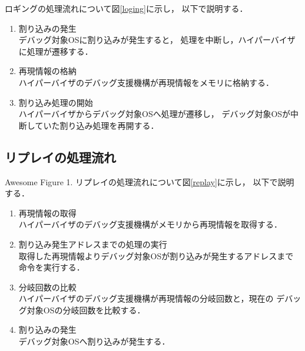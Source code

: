 \documentclass[tanilab-enum]{graduate}
\begin{document}
ロギングの処理流れについて図\ref{loging}に示し，
以下で説明する．
\begin{enumerate}
    \item 割り込みの発生\\
        デバッグ対象OSに割り込みが発生すると，
        処理を中断し，ハイパーバイザに処理が遷移する．
    \item 再現情報の格納\\
        ハイパーバイザのデバッグ支援機構が再現情報をメモリに格納する．
    \item 割り込み処理の開始\\
        ハイパーバイザからデバッグ対象OSへ処理が遷移し，
        デバッグ対象OSが中断していた割り込み処理を再開する．
\end{enumerate}
\subsection{リプレイの処理流れ}
{Awesome Figure 1.} 
リプレイの処理流れについて図\ref{replay}に示し，
以下で説明する．
\begin{enumerate}
    \item 再現情報の取得\\
        ハイパーバイザのデバッグ支援機構がメモリから再現情報を取得する．
    \item 割り込み発生アドレスまでの処理の実行\\
        取得した再現情報よりデバッグ対象OSが割り込みが発生するアドレスまで
        命令を実行する．
    \item 分岐回数の比較\\
        ハイパーバイザのデバッグ支援機構が再現情報の分岐回数と，現在の
        デバッグ対象OSの分岐回数を比較する．
    \item 割り込みの発生\\
        デバッグ対象OSへ割り込みが発生する．
\end{enumerate}
    
\end{document}
